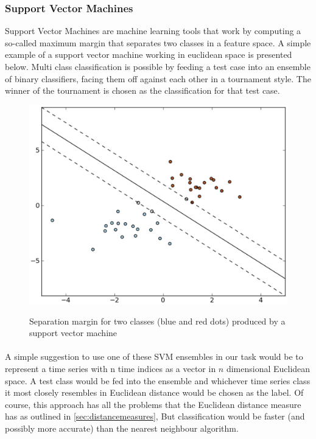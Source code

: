 	\subsubsection{Support Vector Machines}
	\label{sec:svms}
	Support Vector Machines are machine learning tools that work by computing a so-called maximum margin that separates two classes in a feature space. A simple example of a support vector machine working in euclidean space is presented below. Multi class classification is possible by feeding a test case into an ensemble of binary classifiers, facing them off against each other in a tournament style. The winner of the tournament is chosen as the classification for that test case.
	\begin{figure}[ht!]
	\centering
	\includegraphics[width=120mm]{images/svmmargin.eps}
	\label{svmtrain}
	\caption{Separation margin for two classes (blue and red dots) produced  by a support vector machine}
	\end{figure}
	\paragraph{}
	A simple suggestion to use one of these SVM ensembles in our task would be to represent a time series with n time indices as a vector in $n$ dimensional Euclidean space. A test class would be fed into the ensemble and whichever time series class it most closely resembles in Euclidean distance would be chosen as the label. Of course, this approach has all the problems that the Euclidean distance measure has as outlined in \ref{sec:distancemeasures}, But classification would be faster (and possibly more accurate) than the nearest neighbour algorithm.
